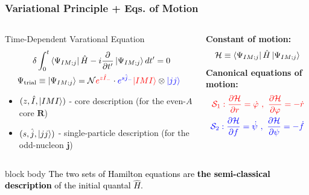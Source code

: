 \documentclass{beamer}
\begin{document}
\begin{frame}
	\frametitle{Variational Principle + Eqs. of Motion}
	\begin{columns}
		\begin{column}{0.6\textwidth}
			\begin{exampleblock}{Time-Dependent Varational Equation}
				\begin{align}
					\delta&\int_0^t\bra{\Psi_{IM;j}}\hat{H}-i\frac{\partial}{\partial t'}\ket{\Psi_{IM;j}}dt'=0\nonumber\\
					\Psi_\text{trial}&\equiv\ket{\Psi_{IM;j}}=\mathcal{N}{\color{red}e^{z\hat{I}_-}}\cdot{\color{blue}e^{s\hat{j}_-}}{\color{red}\ket{IMI}}\otimes{\color{blue}\ket{jj}}\nonumber
				\end{align}
				\begin{itemize}
					\item {\color{red}$(z,\hat{I},\ket{IMI})$} - core description (for the even-$A$ core {\color{red}$\mathbf{R}$})
					\item {\color{blue}$(s,\hat{j},\ket{jj})$} - single-particle description (for the {\color{blue}odd-nucleon $\mathbf{j}$})
				\end{itemize}
			\end{exampleblock}
		\end{column}
		\begin{column}{0.4\textwidth}
			\textbf{Constant of motion:}
			\begin{align}
				\mathcal{H}\equiv\bra{\Psi_{IM;j}}\hat{H}\ket{\Psi_{IM;j}}\nonumber
			\end{align}
			\textbf{Canonical equations of motion:}
			\begin{align}
				{\color{red}\mathcal{S}_1: \frac{\partial \mathcal{H}}{\partial r}=\dot{\varphi}\ ,\ \frac{\partial \mathcal{H}}{\partial \varphi}=-\dot{r}}\nonumber\\
				{\color{blue}\mathcal{S}_2: \frac{\partial \mathcal{H}}{\partial f}=\dot{\psi}\ ,\ \frac{\partial \mathcal{H}}{\partial \psi}=-\dot{f}}\nonumber
			\end{align}
		\end{column}
	\end{columns}
	\begin{beamercolorbox}[rounded=true,shadow=false, wd=\linewidth,]{block body}
		\centering
		\textcolor{black}{\small{The two sets of Hamilton equations are \textbf{the semi-classical description} of the initial quantal $\hat{H}$.}}
	\end{beamercolorbox}
\end{frame}
\end{document}
